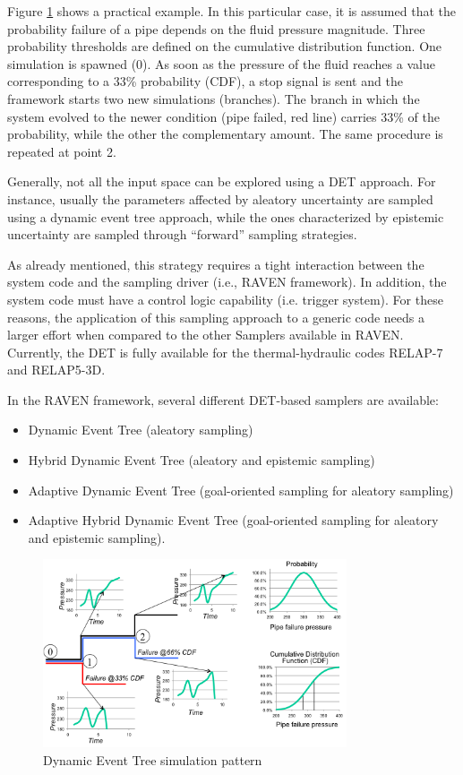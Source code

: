 Figure \ref{fig:DETschemeExample} shows a practical example. In this particular case, it is assumed that the 
probability failure of a pipe depends on the fluid pressure magnitude. Three probability thresholds are defined on 
the cumulative distribution function. One simulation is spawned (0). As soon as the pressure of the fluid reaches a 
value corresponding to a 33\% probability (CDF), a stop signal is sent and the framework starts two new 
simulations (branches). The branch in which the system evolved to the newer condition (pipe failed, red line) 
carries 33\% of the probability, while the other the complementary amount. The same procedure is repeated at 
point 2.

Generally, not all the input space can be explored using a DET approach. For instance, usually the parameters affected by aleatory uncertainty are sampled using a dynamic event tree approach, while the ones characterized by epistemic uncertainty are sampled through ``forward'' sampling strategies. 

As already mentioned, this strategy requires a tight interaction between the system code and the sampling driver (i.e., RAVEN framework). In addition, the system code must have a control logic capability (i.e. trigger system). For these reasons, the application of this sampling approach to a generic code needs a larger effort when compared to the other Samplers available in RAVEN. Currently, the DET is fully available for the thermal-hydraulic codes RELAP-7 and RELAP5-3D.

In the RAVEN framework, several different DET-based samplers are available:
\begin{itemize}
\item Dynamic Event Tree (aleatory sampling)
\item Hybrid Dynamic Event Tree (aleatory and epistemic sampling)
\item Adaptive Dynamic Event Tree (goal-oriented sampling for aleatory sampling)
\item Adaptive Hybrid Dynamic Event Tree (goal-oriented sampling for aleatory and epistemic sampling).
\end{itemize}

\begin{figure}
  \centering
  \includegraphics[width=0.8\textwidth]  {pics/DETscheme.png}
  \caption{Dynamic Event Tree simulation pattern}
  \label{fig:DETschemeExample}
\end{figure}

